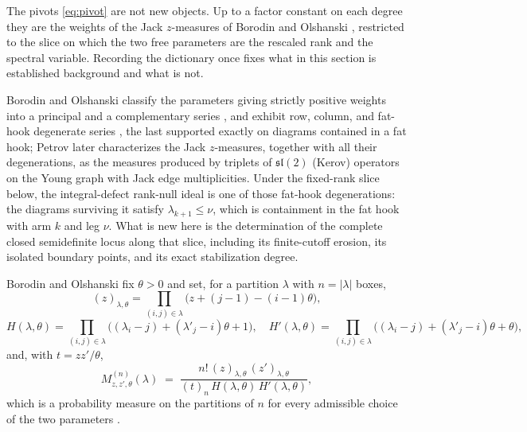 \documentclass[11pt,letterpaper]{article}
\begin{document}
The pivots \eqref{eq:pivot} are not new objects. Up to a factor constant on each
degree they are the weights of the Jack $z$-measures of Borodin and Olshanski
\cite{BO}, restricted to the slice on which the two free parameters are the
rescaled rank and the spectral variable. Recording the dictionary once fixes what
in this section is established background and what is not.

Borodin and Olshanski classify the parameters giving strictly positive weights
into a principal and a complementary series \cite[Prop.~1.2]{BO}, and exhibit row,
column, and fat-hook degenerate series \cite[Prop.~1.3, Prop.~1.4]{BO}, the last
supported exactly on diagrams contained in a fat hook; Petrov \cite[Thm.~9.3 and \S9.4.2]{Petrov} later
characterizes the Jack $z$-measures, together with all their degenerations, as
the measures produced by triplets of $\mathfrak{sl}(2)$ (Kerov) operators on the
Young graph with Jack edge multiplicities. Under the fixed-rank slice
below, the integral-defect rank-null ideal is one of those fat-hook
degenerations: the diagrams surviving it satisfy $\lambda_{k+1}\le\nu$, which is
containment in the fat hook with arm $k$ and leg $\nu$. What is new here is the
determination of the complete closed semidefinite locus along that slice,
including its finite-cutoff erosion, its isolated boundary points, and its exact
stabilization degree.

Borodin and Olshanski fix $\theta>0$ and set, for a partition $\lambda$ with
$n=|\lambda|$ boxes,
\begin{equation}
  (z)_{\lambda,\theta}=\prod_{(i,j)\in\lambda}\bigl(z+(j-1)-(i-1)\theta\bigr),
  \label{eq:BOpoch}
\end{equation}
\begin{equation}
  H(\lambda,\theta)=\prod_{(i,j)\in\lambda}\bigl((\lambda_i-j)+(\lambda'_j-i)\theta+1\bigr),
  \quad
  H'(\lambda,\theta)=\prod_{(i,j)\in\lambda}\bigl((\lambda_i-j)+(\lambda'_j-i)\theta+\theta\bigr),
  \label{eq:BOhooks}
\end{equation}
and, with $t=zz'/\theta$,
\begin{equation}
  M^{(n)}_{z,z',\theta}(\lambda)
  \;=\;\frac{n!\,(z)_{\lambda,\theta}\,(z')_{\lambda,\theta}}
            {(t)_n\,H(\lambda,\theta)\,H'(\lambda,\theta)} ,
  \label{eq:zmeasure}
\end{equation}
which is a probability measure on the partitions of $n$ for every admissible
choice of the two parameters \cite[\S1]{BO}.
\end{document}
